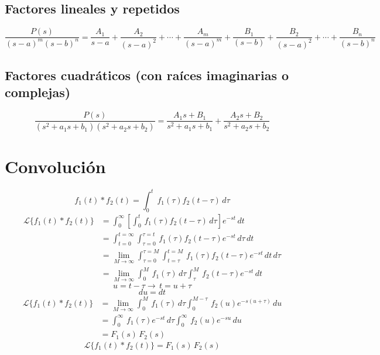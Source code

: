 \subsection{Factores lineales y repetidos}
\begin{equation*}
    \frac{P(s)}{{(s-a)}^m{(s-b)}^n}
        =\frac{A_1}{s-a}+\frac{A_2}{{(s-a)}^2}+\cdots+\frac{A_m}{{(s-a)}^m}
        +\frac{B_1}{(s-b)}+\frac{B_2}{{(s-a)}^2}+\cdots+\frac{B_n}{{(s-b)}^n}
\end{equation*}

\subsection{Factores cuadráticos (con raíces imaginarias o complejas)}
\begin{equation*}
    \frac{P(s)}{(s^2+{a_1}s+b_1)(s^2+{a_2}s+b_2)}
        =\frac{{A_1}s+B_1}{s^2+{a_1}s+b_1}
        +\frac{{A_2}s+B_2}{s^2+{a_2}s+b_2}
\end{equation*}

\section{Convolución}
\begin{equation*}
    f_1(t)*f_2(t)=\int_0^t\,f_1(\tau)f_2(t-\tau)\,d\tau
\end{equation*}
\begin{equation*}
\begin{split}
    \mathcal{L}\{f_1(t)*f_2(t)\}
        &=\int_0^{\infty}\left[\int_0^t\,f_1(\tau)f_2(t-\tau)\,d\tau\right]e^{-st}\,dt\\
        &=\int_{t=0}^{t=\infty}\int_{\tau=0}^{\tau=t}\,f_1(\tau)f_2(t-\tau)e^{-st}\,d\tau\,dt\\
        &=\lim_{M\rightarrow\infty}\int_{\tau=0}^{\tau=M}\int_{t=\tau}^{t=M}\,f_1(\tau)f_2(t-\tau)e^{-st}\,dt\,d\tau\\
        &=\lim_{M\rightarrow\infty}\int_0^M\,f_1(\tau)\,d\tau\int_{\tau}^{M}\,f_2(t-\tau)e^{-st}\,dt
\end{split}
\end{equation*}
\begin{equation*}
    u=t-\tau\rightarrow\,t=u+\tau
\end{equation*}
\begin{equation*}
    du=dt
\end{equation*}
\begin{equation*}
\begin{split}
    \mathcal{L}\{f_1(t)*f_2(t)\}
        &=\lim_{M\rightarrow\infty}\int_0^M\,f_1(\tau)\,d\tau\int_{0}^{M-\tau}\,f_2(u)e^{-s(u+\tau)}\,du\\
        &=\int_0^{\infty}\,f_1(\tau)e^{-st}\,d\tau\int_0^{\infty}\,f_2(u)e^{-su}\,du\\
        &=F_1(s)\,F_2(s)
\end{split}
\end{equation*}
\begin{equation}
    \mathcal{L}\{f_1(t)*f_2(t)\}=F_1(s)\,F_2(s)
\end{equation}


